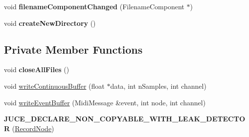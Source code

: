 \begin{DoxyCompactItemize}
\item 
\hypertarget{classRecordNode_a18e27b2842124012d915fdfd2e272d96}{void {\bfseries filename\-Component\-Changed} (Filename\-Component $\ast$)}\label{classRecordNode_a18e27b2842124012d915fdfd2e272d96}

\item 
\hypertarget{classRecordNode_abbbb21fd91cc96595d377addb3e71bf5}{void {\bfseries create\-New\-Directory} ()}\label{classRecordNode_abbbb21fd91cc96595d377addb3e71bf5}

\end{DoxyCompactItemize}
\subsection*{Private Member Functions}
\begin{DoxyCompactItemize}
\item 
\hypertarget{classRecordNode_ac0b7f68959e87a84b7c8dd2e31dce4cd}{void {\bfseries close\-All\-Files} ()}\label{classRecordNode_ac0b7f68959e87a84b7c8dd2e31dce4cd}

\item 
void \hyperlink{classRecordNode_a8ef29a4715a5034bf2e101ac9a06a1d7}{write\-Continuous\-Buffer} (float $\ast$data, int n\-Samples, int channel)
\item 
void \hyperlink{classRecordNode_ade1f1f1fdff335a3d67632368154b853}{write\-Event\-Buffer} (Midi\-Message \&event, int node, int channel)
\item 
\hypertarget{classRecordNode_adfd8695c0064f1306a66c9096e486375}{{\bfseries J\-U\-C\-E\-\_\-\-D\-E\-C\-L\-A\-R\-E\-\_\-\-N\-O\-N\-\_\-\-C\-O\-P\-Y\-A\-B\-L\-E\-\_\-\-W\-I\-T\-H\-\_\-\-L\-E\-A\-K\-\_\-\-D\-E\-T\-E\-C\-T\-O\-R} (\hyperlink{classRecordNode}{Record\-Node})}\label{classRecordNode_adfd8695c0064f1306a66c9096e486375}

\end{DoxyCompactItemize}
